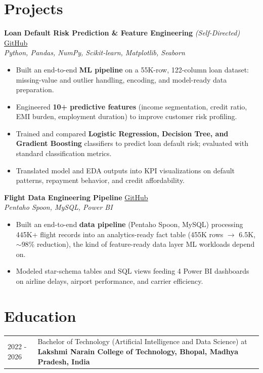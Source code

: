 \documentclass[a4paper,10pt]{article}
\begin{document}
\section{Projects}
\textbf{Loan Default Risk Prediction \& Feature Engineering} \textit{(Self-Directed)} \hfill \href{https://github.com/Rider-04/bank-loan-default-risk-analysis}{GitHub} \\
\textit{Python, Pandas, NumPy, Scikit-learn, Matplotlib, Seaborn}
\begin{itemize}[nosep,after=\strut, leftmargin=1em, itemsep=1pt,label=--]
\item Built an end-to-end \textbf{ML pipeline} on a 55K-row, 122-column loan dataset: missing-value and outlier handling, encoding, and model-ready data preparation.
\item Engineered \textbf{10+ predictive features} (income segmentation, credit ratio, EMI burden, employment duration) to improve customer risk profiling.
\item Trained and compared \textbf{Logistic Regression, Decision Tree, and Gradient Boosting} classifiers to predict loan default risk; evaluated with standard classification metrics.
\item Translated model and EDA outputs into KPI visualizations on default patterns, repayment behavior, and credit affordability.
\end{itemize}
\vspace{2pt}
\textbf{Flight Data Engineering Pipeline} \hfill \href{https://github.com/Rider-04/flight-data-engineering-pipeline.git}{GitHub} \\
\textit{Pentaho Spoon, MySQL, Power BI}
\begin{itemize}[nosep,after=\strut, leftmargin=1em, itemsep=1pt,label=--]
\item Built an end-to-end \textbf{data pipeline} (Pentaho Spoon, MySQL) processing 445K+ flight records into an analytics-ready fact table (455K rows $\rightarrow$ 6.5K, $\sim$98\% reduction), the kind of feature-ready data layer ML workloads depend on.
\item Modeled star-schema tables and SQL views feeding 4 Power BI dashboards on airline delays, airport performance, and carrier efficiency.
\end{itemize}
\vspace{2pt}

\section{Education}
\begin{tabularx}{\linewidth}{@{}l X@{}}
2022 - 2026 & Bachelor of Technology (Artificial Intelligence and Data Science) at \textbf{Lakshmi Narain College of Technology, Bhopal, Madhya Pradesh, India} \\
\end{tabularx}
\end{document}
